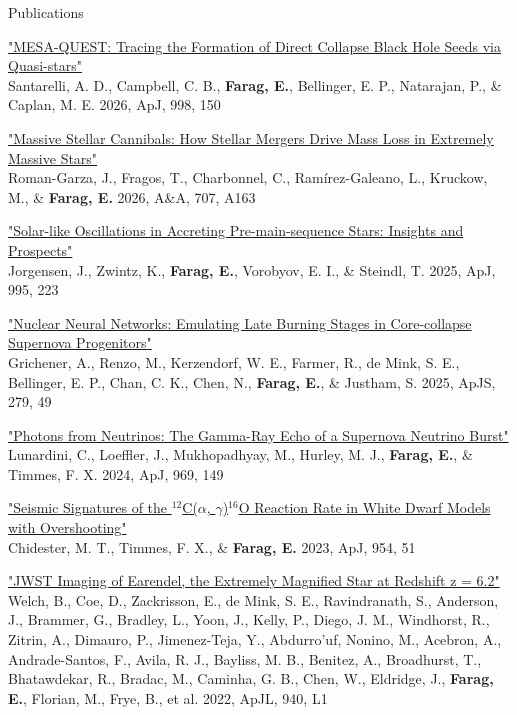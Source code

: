 \begin{rSection}{Publications}
\begin{revnumerate}
\item \href{https://ui.adsabs.harvard.edu/abs/2026ApJ...998..150S/abstract}{"MESA-QUEST: Tracing the Formation of Direct Collapse Black Hole Seeds via Quasi-stars"}
\\ Santarelli, A. D., Campbell, C. B., \textbf{Farag, E.}, Bellinger, E. P., Natarajan, P., \& Caplan, M. E. 2026, ApJ, 998, 150

\item \href{https://ui.adsabs.harvard.edu/abs/2026A%26A...707A.163R/abstract}{"Massive Stellar Cannibals: How Stellar Mergers Drive Mass Loss in Extremely Massive Stars"}
\\ Roman-Garza, J., Fragos, T., Charbonnel, C., Ramírez-Galeano, L., Kruckow, M., \& \textbf{Farag, E.} 2026, A\&A, 707, A163

\item \href{https://ui.adsabs.harvard.edu/abs/2025ApJ...995..223J/abstract}{"Solar-like Oscillations in Accreting Pre-main-sequence Stars: Insights and Prospects"}
\\ Jorgensen, J., Zwintz, K., \textbf{Farag, E.}, Vorobyov, E. I., \& Steindl, T. 2025, ApJ, 995, 223

\item \href{https://ui.adsabs.harvard.edu/abs/2025ApJS..279...49G/abstract}{"Nuclear Neural Networks: Emulating Late Burning Stages in Core-collapse Supernova Progenitors"}
\\ Grichener, A., Renzo, M., Kerzendorf, W. E., Farmer, R., de Mink, S. E., Bellinger, E. P., Chan, C. K., Chen, N., \textbf{Farag, E.}, \& Justham, S. 2025, ApJS, 279, 49

\item \href{https://ui.adsabs.harvard.edu/abs/2024ApJ...969..149L/abstract}{"Photons from Neutrinos: The Gamma-Ray Echo of a Supernova Neutrino Burst"}
\\ Lunardini, C., Loeffler, J., Mukhopadhyay, M., Hurley, M. J., \textbf{Farag, E.}, \& Timmes, F. X. 2024, ApJ, 969, 149

\item \href{https://ui.adsabs.harvard.edu/abs/2023ApJ...954...51C/abstract}{"Seismic Signatures of the $^{12}$C($\alpha$, $\gamma$)$^{16}$O Reaction Rate in White Dwarf Models with Overshooting"}
\\ Chidester, M. T., Timmes, F. X., \& \textbf{Farag, E.} 2023, ApJ, 954, 51

\item \href{https://ui.adsabs.harvard.edu/abs/2022ApJ...940L...1W/abstract}{"JWST Imaging of Earendel, the Extremely Magnified Star at Redshift z = 6.2"}
\\ Welch, B., Coe, D., Zackrisson, E., de Mink, S. E., Ravindranath, S., Anderson, J., Brammer, G., Bradley, L., Yoon, J., Kelly, P., Diego, J. M., Windhorst, R., Zitrin, A., Dimauro, P., Jimenez-Teja, Y., Abdurro'uf, Nonino, M., Acebron, A., Andrade-Santos, F., Avila, R. J., Bayliss, M. B., Benitez, A., Broadhurst, T., Bhatawdekar, R., Bradac, M., Caminha, G. B., Chen, W., Eldridge, J., \textbf{Farag, E.}, Florian, M., Frye, B., et al. 2022, ApJL, 940, L1


\end{revnumerate}
\end{rSection}

